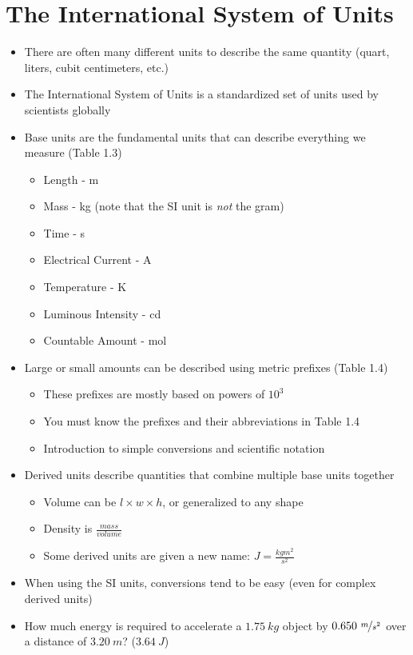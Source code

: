 \documentclass[12pt, openany, letterpaper]{memoir}
\begin{document}
\section{The International System of Units}
\begin{itemize}
	\item There are often many different units to describe the same quantity (quart, liters, cubit centimeters, etc.)
	\item The International System of Units is a standardized set of units used by scientists globally
	\item Base units are the fundamental units that can describe everything we measure (Table 1.3)
	      \begin{itemize}
		      \item Length - m
		      \item Mass - kg (note that the SI unit is \emph{not} the gram)
		      \item Time - s
		      \item Electrical Current - A
		      \item Temperature - K
		      \item Luminous Intensity - cd
		      \item Countable Amount - mol
	      \end{itemize}
	\item Large or small amounts can be described using metric prefixes (Table 1.4)
	      \begin{itemize}
		      \item These prefixes are mostly based on powers of $10^3$
		      \item You must know the prefixes and their abbreviations in Table 1.4
		      \item Introduction to simple conversions and scientific notation
	      \end{itemize}
	\item Derived units describe quantities that combine multiple base units together
	      \begin{itemize}
		      \item Volume can be $l\times w\times h$, or generalized to any shape
		      \item Density is $\frac{mass}{volume}$
		      \item Some derived units are given a new name: $J=\frac{kgm^2}{s^2}$
	      \end{itemize}
	\item When using the SI units, conversions tend to be easy (even for complex derived units)
	\item How much energy is required to accelerate a $1.75~kg$ object by $0.650~\nicefrac{m}{s^2}$ over a distance of $3.20~m$? ($3.64~J$)
\end{itemize}
\end{document}

